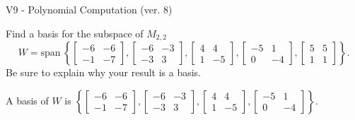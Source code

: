 \begin{exercise}
  \begin{exerciseTitle}V9 - Polynomial Computation (ver. 8)\end{exerciseTitle}
  \begin{exerciseStatement}
    Find a basis for the subspace of \(M_{2,2}\) 
\[W=\mathrm{span}\ \left\{\left[\begin{array}{cc}
-6 & -6 \\
-1 & -7
\end{array}\right] , \left[\begin{array}{cc}
-6 & -3 \\
-3 & 3
\end{array}\right] , \left[\begin{array}{cc}
4 & 4 \\
1 & -5
\end{array}\right] , \left[\begin{array}{cc}
-5 & 1 \\
0 & -4
\end{array}\right] , \left[\begin{array}{cc}
5 & 5 \\
1 & 1
\end{array}\right]\right\}.\]
 Be sure to explain why your result is a basis.


  \end{exerciseStatement}
  \begin{exerciseAnswer}
   A basis of \(W\) is  \(\left\{\left[\begin{array}{cc}
-6 & -6 \\
-1 & -7
\end{array}\right] , \left[\begin{array}{cc}
-6 & -3 \\
-3 & 3
\end{array}\right] , \left[\begin{array}{cc}
4 & 4 \\
1 & -5
\end{array}\right] , \left[\begin{array}{cc}
-5 & 1 \\
0 & -4
\end{array}\right]\right\}\).
  


  \end{exerciseAnswer}
\end{exercise}